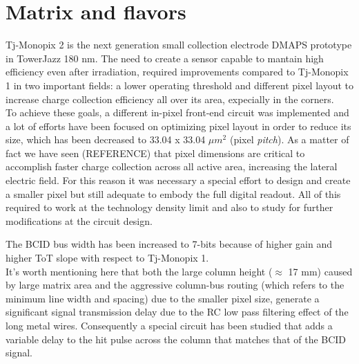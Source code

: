 
\section{Matrix and flavors}



Tj-Monopix 2 is the next generation small collection electrode DMAPS prototype in TowerJazz 180 nm. The need to create a sensor capable to mantain high efficiency even after irradiation, required improvements compared to Tj-Monopix 1 in two important fields: a lower operating threshold and different pixel layout to increase charge collection efficiency all over its area, expecially in the corners.\\

To achieve these goals, a different in-pixel front-end circuit was implemented and a lot of efforts have been focused on optimizing pixel layout in order to reduce its size, which has been decreased to 33.04 x 33.04 $\mu m^{2}$ (pixel \textit{pitch}). As a matter of fact we have seen (REFERENCE) that pixel dimensions are critical to accomplish faster charge collection across all active area, increasing the lateral electric field. For this reason it was necessary a special effort to design and create a smaller pixel but still adequate to embody the full digital readout. All of this required to work at the technology density limit and also to study for further modifications at the circuit design.%

The BCID bus width has been increased  to 7-bits because of higher gain and higher ToT slope with respect to Tj-Monopix 1. \\
It's worth mentioning here that both the large column height ($\approx$ 17 mm) caused by large matrix area and the aggressive column-bus routing (which refers to the minimum line width and spacing) due to the smaller pixel size, generate a significant signal transmission delay due to the RC low pass filtering effect of the long metal wires. Consequently a special circuit has been studied that adds a variable delay to the hit pulse across the column that matches that of the BCID signal.


